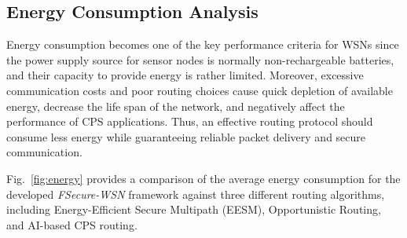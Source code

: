 \documentclass[pdflatex,sn-mathphys-num]{sn-jnl}
\begin{document}
\begin{table}[ht]
\centering
\caption{\textcolor{blue}{Previously reported results for ten stated simulation runs: mean $\pm$ published 95\% confidence-interval half-width. Individual runs were not available for recalculation.}}
\label{tab:complete_results}
\end{table}


\subsection{Energy Consumption Analysis}

Energy consumption becomes one of the key performance criteria for WSNs
since the power supply source for sensor nodes is normally non-rechargeable
batteries, and their capacity to provide energy is rather limited. Moreover,
excessive communication costs and poor routing choices cause quick depletion
of available energy, decrease the life span of the network, and negatively
affect the performance of CPS applications. Thus, an effective routing
protocol should consume less energy while guaranteeing reliable packet
delivery and secure communication.

Fig.~\ref{fig:energy} provides a comparison of the average energy consumption
for the developed \textit{FSecure-WSN} framework against three different
routing algorithms, including Energy-Efficient Secure Multipath (EESM),
Opportunistic Routing, and AI-based CPS routing.
\end{document}
